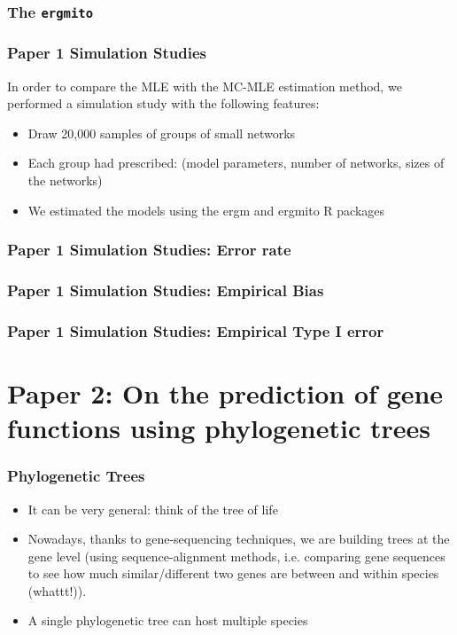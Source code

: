 \documentclass{beamer}
\def\cursection{\frame{\tableofcontents[current]}}
\newcommand{\ergmitopkg}[0]{\texttt{ergmito}}
\begin{document}
\begin{frame}
\frametitle{The \ergmitopkg{}}



\end{frame}

\begin{frame}
\frametitle{Paper 1 Simulation Studies}

In order to compare the MLE with the MC-MLE estimation method, we performed a simulation study with the following features:

\begin{itemize}
\item Draw 20,000 samples of groups of small networks
\item Each group had prescribed: (model parameters, number of networks, sizes of the networks)
\item We estimated the models using the ergm and ergmito R packages
\end{itemize}

\end{frame}

\begin{frame}
\frametitle{Paper 1 Simulation Studies: Error rate}


\end{frame}

\begin{frame}
\frametitle{Paper 1 Simulation Studies: Empirical Bias}


\end{frame}

\begin{frame}
\frametitle{Paper 1 Simulation Studies: Empirical Type I error}


\end{frame}

\section{Paper 2: On the prediction of gene functions using phylogenetic trees}
\cursection

\begin{frame}
\frametitle{Phylogenetic Trees}

\begin{itemize}
\item It can be very general: think of the tree of life
\item Nowadays, thanks to gene-sequencing techniques, we are building trees at the
gene level (using sequence-alignment methods, i.e. comparing gene sequences to see how much similar/different two genes are between and within species (whattt!)).
\item A single phylogenetic tree can host multiple species
\end{itemize}

\end{frame}
\end{document}
